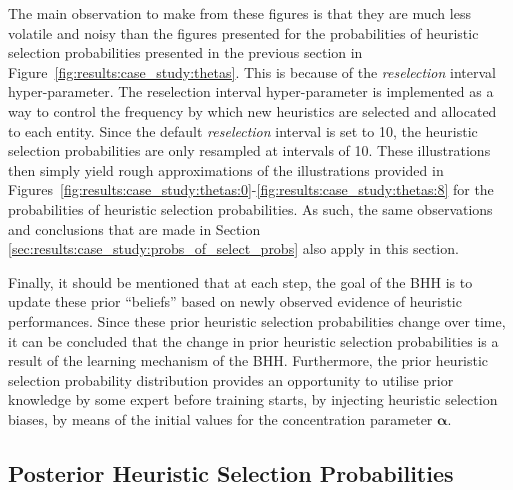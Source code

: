 The main observation to make from these figures is that they are much less volatile and noisy than the figures presented for the probabilities of heuristic selection probabilities presented in the previous section in Figure~\ref{fig:results:case_study:thetas}. This is because of the \textit{reselection} interval hyper-parameter. The reselection interval hyper-parameter is implemented as a way to control the frequency by which new heuristics are selected and allocated to each entity. Since the default \textit{reselection} interval is set to 10, the heuristic selection probabilities are only resampled at intervals of 10. These illustrations then simply yield rough approximations of the illustrations provided in Figures~\ref{fig:results:case_study:thetas:0}-\ref{fig:results:case_study:thetas:8} for the probabilities of heuristic selection probabilities. As such, the same observations and conclusions that are made in Section \ref{sec:results:case_study:probs_of_select_probs} also apply in this section.

Finally, it should be mentioned that at each step, the goal of the \acs{BHH} is to update these prior ``beliefs'' based on newly observed evidence of heuristic performances. Since these prior heuristic selection probabilities change over time, it can be concluded that the change in prior heuristic selection probabilities is a result of the learning mechanism of the \acs{BHH}. Furthermore, the prior heuristic selection probability distribution provides an opportunity to utilise prior knowledge by some expert before training starts, by injecting heuristic selection biases, by means of the initial values for the concentration parameter $\boldsymbol{\alpha}$.




\subsection{Posterior Heuristic Selection Probabilities}\label{sec:results:case_study:posterior_selec_prob}

